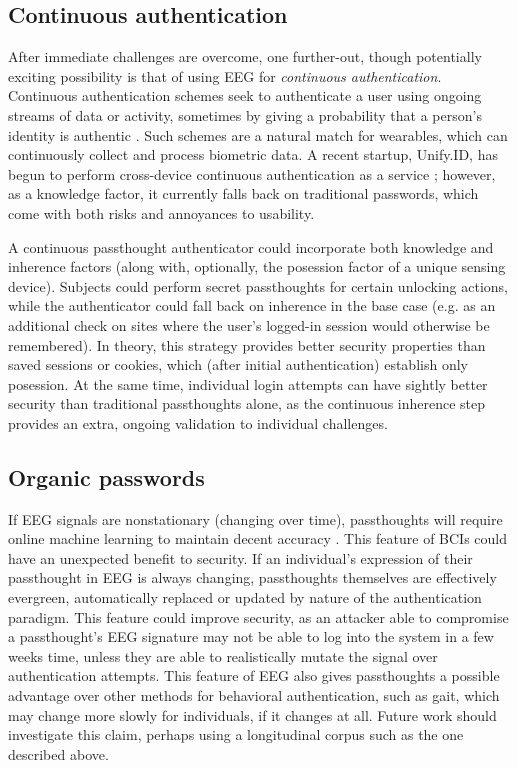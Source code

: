 \documentclass[sigconf]{acmart}
\begin{document}
\subsection{Continuous authentication}
\label{sec:orgd885dff}

After immediate challenges are overcome,
one further-out, though potentially exciting possibility is that of using EEG for \emph{continuous authentication}.
Continuous authentication schemes seek to authenticate a user using ongoing streams of data or activity, sometimes by giving a probability that a person's identity is authentic \cite{Bojinov2012}.
Such schemes are a natural match for wearables, which can continuously collect and process biometric data.
A recent startup, Unify.ID, has begun to perform cross-device continuous authentication as a service \cite{UnifyID2017};
however, as a knowledge factor, it currently falls back on traditional passwords, which come with both risks and annoyances to usability.

A continuous passthought authenticator could incorporate both knowledge and inherence factors (along with, optionally, the posession factor of a unique sensing device).
Subjects could perform secret passthoughts for certain unlocking actions,
while the authenticator could fall back on inherence in the base case (e.g. as an additional check on sites where the user's logged-in session would otherwise be remembered).
In theory, this strategy provides better security properties than saved sessions or cookies, which (after initial authentication) establish only posession. At the same time, individual login attempts can have sightly better security than traditional passthoughts alone, as the continuous inherence step provides an extra, ongoing validation to individual challenges.

\subsection{Organic passwords}
\label{sec:org6c324c8}

If EEG signals are nonstationary (changing over time), passthoughts will require online machine learning to maintain decent accuracy \cite{Vidaurre2006a}.
This feature of BCIs could have an unexpected benefit to security. 
If an individual's expression of their passthought in EEG is always changing, 
passthoughts themselves are effectively evergreen, automatically replaced or updated by nature of the authentication paradigm.
This feature could improve security, as an attacker able to compromise a passthought's EEG signature may not be able to log into the system in a few weeks time,
unless they are able to realistically mutate the signal over authentication attempts.
This feature of EEG also gives passthoughts a possible advantage over other methods for behavioral authentication, such as gait, which may change more slowly for individuals, if it changes at all.
Future work should investigate this claim, perhaps using a longitudinal corpus such as the one described above.
\end{document}
